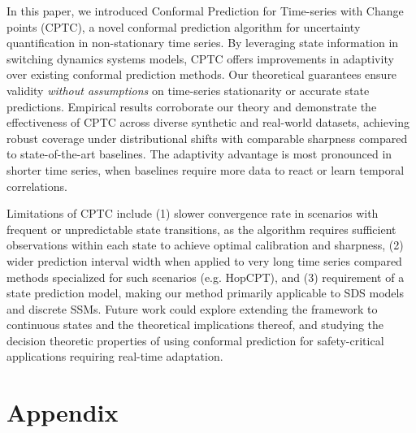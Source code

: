 In this paper, we introduced Conformal Prediction for Time-series with Change points (CPTC), a novel conformal prediction algorithm for uncertainty quantification in non-stationary time series. By leveraging state information in switching dynamics systems models, CPTC offers improvements in adaptivity over existing conformal prediction methods. Our theoretical guarantees ensure validity \textit{without assumptions} on time-series stationarity or accurate
state predictions. Empirical results corroborate our theory and demonstrate the effectiveness of CPTC across diverse synthetic and real-world datasets, achieving robust coverage under distributional shifts with comparable sharpness compared to state-of-the-art baselines. The adaptivity advantage is most pronounced in shorter time series, when baselines require more data to react or learn temporal correlations. %

Limitations of CPTC include (1) slower convergence rate in scenarios with frequent or unpredictable state transitions, as the algorithm requires sufficient observations within each state to achieve optimal calibration and sharpness, (2) wider prediction interval width when applied to very long time series compared methods specialized for such scenarios (e.g. HopCPT), and (3) requirement of a state prediction model, making our method primarily applicable to SDS models and discrete SSMs. Future work could explore extending the framework to continuous states and the theoretical implications thereof, and studying the decision theoretic properties of using conformal prediction for safety-critical applications requiring real-time adaptation.





% 
% 

\section{Appendix}


% 
% 
